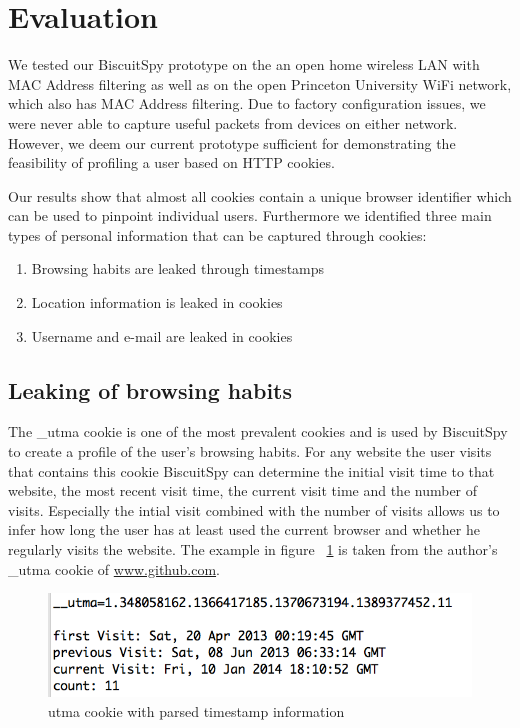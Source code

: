 \section{Evaluation}
\label{sec:eval}

We tested our BiscuitSpy prototype on the an open home wireless LAN with MAC Address filtering as well as on the open Princeton University WiFi network, which also has MAC Address filtering. Due to factory configuration issues, we were never able to capture useful packets from devices on either network. However, we deem our current prototype sufficient for demonstrating the feasibility of profiling a user based on HTTP cookies.

Our results show that almost all cookies contain a unique browser identifier which can be used to pinpoint individual users. Furthermore we identified three main types of personal information that can be captured through cookies:

\begin{enumerate} \itemsep1pt \parskip0pt 
  \item Browsing habits are leaked through timestamps
  \item Location information is leaked in cookies
  \item Username and e-mail are leaked in cookies
\end{enumerate}

\subsection{Leaking of browsing habits}
The \_utma cookie is one of the most prevalent cookies and is used by BiscuitSpy to create a profile of the user's browsing habits. For any website the user visits that contains this cookie BiscuitSpy can determine the initial visit time to that website, the most recent visit time, the current visit time and the number of visits. Especially the intial visit combined with the number of visits allows us to infer how long the user has at least used the current browser and whether he regularly visits the website. The example in figure ~\ref{fig:utma2} is taken from the author's \_utma cookie of  \url{www.github.com}.

\begin{figure}[h]
\centering
\includegraphics[scale=0.4]{./diagrams/utma2.png}
\caption{utma cookie with parsed timestamp information}
\label{fig:utma2}
\end{figure}


